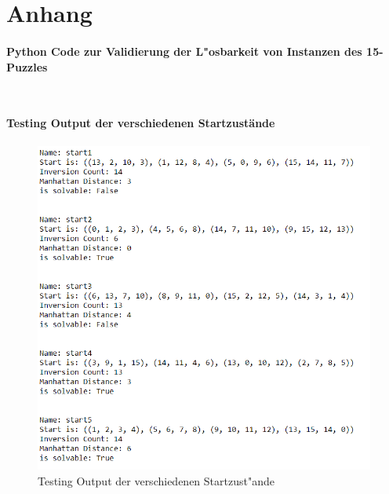 \chapter{Anhang}


\subsubsection{Python Code zur Validierung der L"osbarkeit von Instanzen des 15-Puzzles}
\label{ssec:appendix-latency-benchmark}
\begin{lstlisting}[caption={Python Code zur Validierung der L"osbarkeit von Instanzen des 15-Puzzles}, label={code:validate-15-puzzle:py}]
\end{lstlisting}
\inputminted[linenos,breaklines,breakanywhere]{python}{../code/15-solvable.py}
\newpage

\subsubsection{Testing Output der verschiedenen Startzust\"ande}
\begin{figure}[H]
    \centering
    \includegraphics[width=\linewidth,keepaspectratio]{img/testing_output.PNG}
    \captionsetup{format=plain, indention=0pt}
    \caption{Testing Output der verschiedenen Startzust"ande \label{app:fig:testing-output}}
\end{figure}

